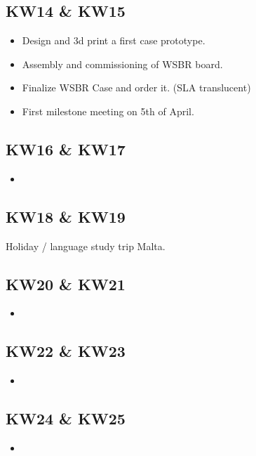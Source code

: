 \subsection{KW14 \& KW15}
\label{ssec:KW14_KW15}
\begin{itemize}
    \item Design and 3d print a first case prototype.
    \item Assembly and commissioning of WSBR board.
    \item Finalize WSBR Case and order it. (SLA translucent)
    \item First milestone meeting on 5th of April.
\end{itemize}


\subsection{KW16 \& KW17}
\label{ssec:KW16_KW17}
\begin{itemize}
    \item 
\end{itemize}


\subsection{KW18 \& KW19}
\label{ssec:KW18_KW19}
Holiday / language study trip Malta.


\subsection{KW20 \& KW21}
\label{ssec:KW20_KW21}
\begin{itemize}
    \item 
\end{itemize}


\subsection{KW22 \& KW23}
\label{ssec:KW22_KW23}
\begin{itemize}
    \item 
\end{itemize}


\subsection{KW24 \& KW25}
\label{ssec:KW24_KW25}
\begin{itemize}
    \item 
\end{itemize}
\newpage




